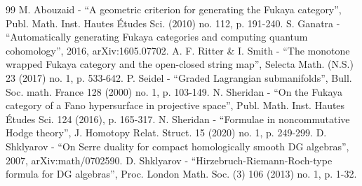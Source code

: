 \begin{thebibliography}{99}
 M. Abouzaid - “A geometric criterion for generating the Fukaya category”, Publ. Math. Inst. Hautes Études Sci. (2010) no. 112, p. 191-240.
 S. Ganatra - “Automatically generating Fukaya categories and computing quantum cohomology”, 2016, arXiv:1605.07702.
 A. F. Ritter \& I. Smith - “The monotone wrapped Fukaya category and the open-closed string map”, Selecta Math. (N.S.) 23 (2017) no. 1, p. 533-642.
 P. Seidel - “Graded Lagrangian submanifolds”, Bull. Soc. math. France 128 (2000) no. 1, p. 103-149.
 N. Sheridan - “On the Fukaya category of a Fano hypersurface in projective space”, Publ. Math. Inst. Hautes Études Sci. 124 (2016), p. 165-317.
 N. Sheridan - “Formulae in noncommutative Hodge theory”, J. Homotopy Relat. Struct. 15 (2020) no. 1, p. 249-299.
 D. Shklyarov - “On Serre duality for compact homologically smooth DG algebras”, 2007, arXiv:math/0702590.
 D. Shklyarov - “Hirzebruch-Riemann-Roch-type formula for DG algebras”, Proc. London Math. Soc. (3) 106 (2013) no. 1, p. 1-32.
\end{thebibliography}
